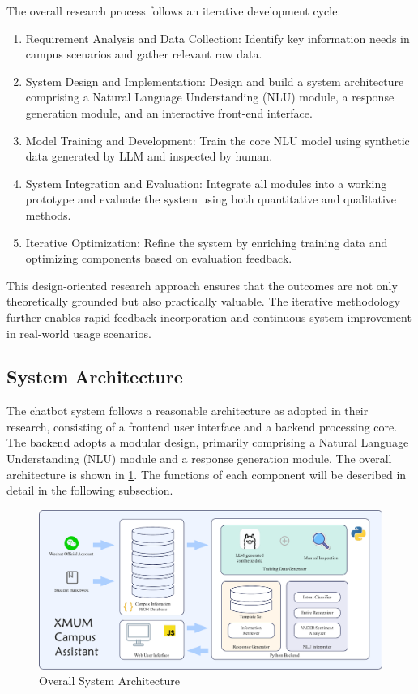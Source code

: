 \documentclass{xum_review}
\begin{document}
	\noindent The overall research process follows an iterative development cycle:
	\begin{enumerate}
		\item	Requirement Analysis and Data Collection: Identify key
		information needs in campus scenarios and gather relevant raw data.
		\item	System Design and Implementation: Design and build a system
		architecture comprising a Natural Language Understanding (NLU) module, a
		response generation module, and an interactive front-end interface.
		\item	Model Training and Development: Train the core NLU model using
		synthetic data generated by LLM and inspected by human.
		\item	System Integration and Evaluation: Integrate all modules into a
		working prototype and evaluate the system using both quantitative and
		qualitative methods.
		\item	Iterative Optimization: Refine the system by enriching training
		data and optimizing components based on evaluation feedback.
	\end{enumerate}

	This design-oriented research approach ensures that the outcomes are not
	only theoretically grounded but also practically valuable. The iterative
	methodology further enables rapid feedback incorporation and continuous
	system improvement in real-world usage scenarios.

	\subsection{System Architecture}

	The chatbot system follows a reasonable architecture as
	\citet{mohammed2022chatbotarchitecture} adopted in their research,
	consisting of a frontend user interface and a backend processing core. The
	backend adopts a modular design, primarily comprising a Natural Language
	Understanding (NLU) module and a response generation module. The overall
	architecture is shown in \cref{fig:system_architecture}. The functions
	of each component will be described in detail in the following subsection.


	\begin{figure}[H]
		\centering
		\includegraphics[width=1\textwidth]{figure/overall_flowchart.pdf}
		\caption{Overall System Architecture}
		\label{fig:system_architecture}
	\end{figure}
\end{document}
